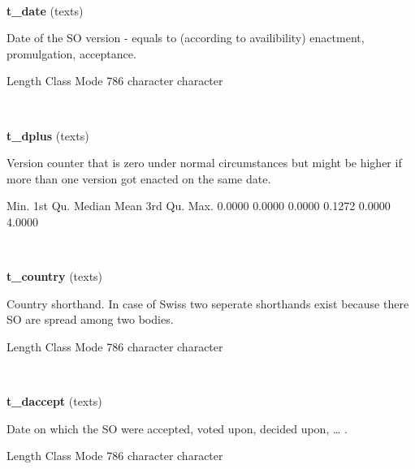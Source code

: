 \documentclass[]{article}
\newenvironment{Shaded}{\begin{snugshade}}{\end{snugshade}}
\newcommand{\DecValTok}[1]{\textcolor[rgb]{0.00,0.00,0.81}{{#1}}}
\newcommand{\FloatTok}[1]{\textcolor[rgb]{0.00,0.00,0.81}{{#1}}}
\newcommand{\NormalTok}[1]{{#1}}
\begin{document}
~

\vspace{1em}

\textbf{t\_date} (texts)

Date of the SO version - equals to (according to availibility)
enactment, promulgation, acceptance.

\begin{Shaded}
\begin{Highlighting}[]
   \NormalTok{Length     Class      Mode }
      \DecValTok{786} \NormalTok{character character }
\end{Highlighting}
\end{Shaded}

~

\vspace{1em}

\textbf{t\_dplus} (texts)

Version counter that is zero under normal circumstances but might be
higher if more than one version got enacted on the same date.

\begin{Shaded}
\begin{Highlighting}[]
   \NormalTok{Min. 1st Qu.  Median    Mean 3rd Qu.    Max. }
 \FloatTok{0.0000}  \FloatTok{0.0000}  \FloatTok{0.0000}  \FloatTok{0.1272}  \FloatTok{0.0000}  \FloatTok{4.0000} 
\end{Highlighting}
\end{Shaded}

~

\vspace{1em}

\textbf{t\_country} (texts)

Country shorthand. In case of Swiss two seperate shorthands exist
because there SO are spread among two bodies.

\begin{Shaded}
\begin{Highlighting}[]
   \NormalTok{Length     Class      Mode }
      \DecValTok{786} \NormalTok{character character }
\end{Highlighting}
\end{Shaded}

~

\vspace{1em}

\textbf{t\_daccept} (texts)

Date on which the SO were accepted, voted upon, decided upon, \ldots{} .

\begin{Shaded}
\begin{Highlighting}[]
   \NormalTok{Length     Class      Mode }
      \DecValTok{786} \NormalTok{character character }
\end{Highlighting}
\end{Shaded}
\end{document}
